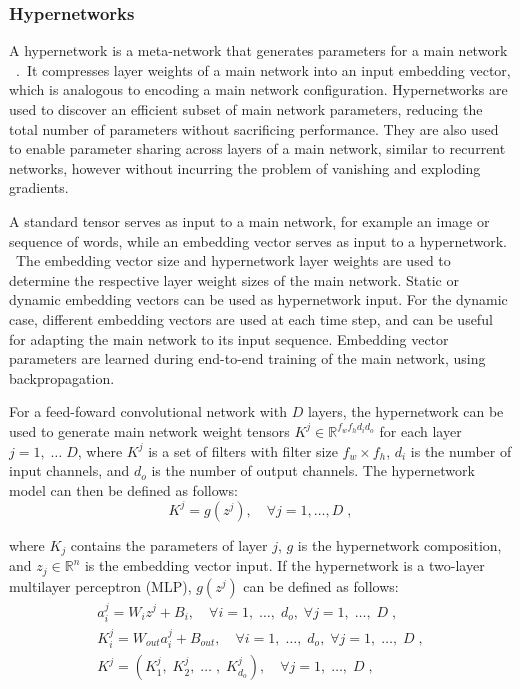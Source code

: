 \subsubsection{Hypernetworks}

A hypernetwork is a meta-network that generates parameters for a main network \unskip ~\citep{ha2016hypernetworks}.\ It compresses layer weights of a main network into an input embedding vector, which is analogous to encoding a main network configuration. Hypernetworks are used to discover an efficient subset of main network parameters, reducing the total number of parameters without sacrificing performance. They are also used to enable parameter sharing across layers of a main network, similar to recurrent networks, however without incurring the problem of vanishing and exploding gradients. \par

\noindent A standard tensor serves as input to a main network, for example an image or sequence of words, while an embedding vector serves as input to a hypernetwork. \ The embedding vector size and hypernetwork layer weights are used to determine the respective layer weight sizes of the main network. Static or dynamic embedding vectors  can be used as hypernetwork input. For the dynamic case, different embedding vectors are used at each time step, and can be useful for adapting the main network to its input sequence. Embedding vector parameters are learned during end-to-end training of the main network, using backpropagation. \par

\noindent For a feed-foward convolutional network with $ D $ layers, the hypernetwork can be used to generate main network weight tensors $ K^j \in \mathbb{R}^{f_wf_hd_id_o} $ for each layer $ j = 1, \; \dots \; D $, where $ K^j $ is a set of filters with filter size $ f_w \times f_h $, $ d_i $ is the number of input channels, and $ d_o $ is the number of output channels. The hypernetwork model can then be defined as follows: 
\begin{equation}
	K^j = g(z^j), \quad \forall j = 1, \dots, D \; ,
\end{equation}

\noindent where $ K_j $ contains the parameters of layer $ j $, $ g $ is the hypernetwork composition, and $ z_j \in \mathbb{R}^n $ is the embedding vector input. If the hypernetwork is a two-layer multilayer perceptron (MLP), $ g(z^j) $ can be defined as follows:  
\begin{subequations}
	\begin{gather}
		a_i^j = W_iz^j + B_i, \quad \forall i = 1, \; \dots, \; d_o, \; \forall j = 1, \; \dots, \; D \; , \\
		K_i^j = W_{out}a_i^j + B_{out}, \quad \forall i = 1, \; \dots, \; d_o, \; \forall j = 1, \; \dots, \; D \; , \\
		K^j = (K_1^j, \; K_2^j, \; \dots \;, \; K_{d_o}^j), \quad \forall j = 1, \; \dots, \; D \; ,
	\end{gather}
\end{subequations}

